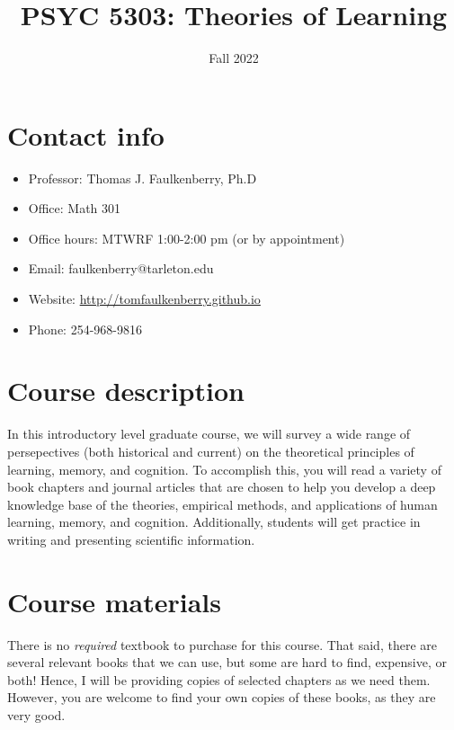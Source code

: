 \documentclass[10pt]{article}
\date{Fall 2022}
\title{PSYC 5303: Theories of Learning}
\begin{document}
\maketitle

\section*{Contact info}
\label{sec:org0344eaa}
\begin{itemize}
\item Professor: Thomas J. Faulkenberry, Ph.D
\item Office: Math 301
\item Office hours: MTWRF 1:00-2:00 pm (or by appointment)
\item Email: faulkenberry@tarleton.edu
\item Website: \url{http://tomfaulkenberry.github.io}
\item Phone: 254-968-9816
\end{itemize}

\section*{Course description}
\label{sec:org02f388a}

In this introductory level graduate course, we will survey a wide range of persepectives (both historical and current) on the theoretical principles of learning, memory, and cognition.  To accomplish this, you will read a variety of book chapters and journal articles that are chosen to help you develop a deep knowledge base of the theories, empirical methods, and applications of human learning, memory, and cognition. Additionally, students will get practice in writing and presenting scientific information.

\section*{Course materials}
\label{sec:org1c5e829}

There is no \emph{required} textbook to purchase for this course. That said, there are several relevant books that we can use, but some are hard to find, expensive, or both!  Hence, I will be providing copies of selected chapters as we need them.  However, you are welcome to find your own copies of these books, as they are very good.
\end{document}
